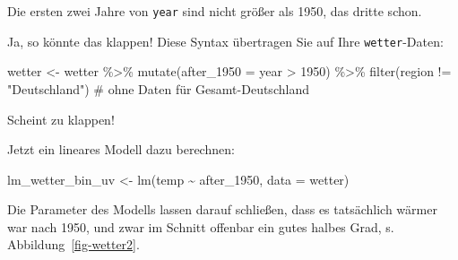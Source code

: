\documentclass[
  letterpaper,
]{scrbook}
\newenvironment{Shaded}{\begin{snugshade}}{\end{snugshade}}
\newcommand{\AttributeTok}[1]{\textcolor[rgb]{0.40,0.45,0.13}{#1}}
\newcommand{\CommentTok}[1]{\textcolor[rgb]{0.37,0.37,0.37}{#1}}
\newcommand{\DecValTok}[1]{\textcolor[rgb]{0.68,0.00,0.00}{#1}}
\newcommand{\FunctionTok}[1]{\textcolor[rgb]{0.28,0.35,0.67}{#1}}
\newcommand{\NormalTok}[1]{\textcolor[rgb]{0.00,0.23,0.31}{#1}}
\newcommand{\OtherTok}[1]{\textcolor[rgb]{0.00,0.23,0.31}{#1}}
\newcommand{\SpecialCharTok}[1]{\textcolor[rgb]{0.37,0.37,0.37}{#1}}
\newcommand{\StringTok}[1]{\textcolor[rgb]{0.13,0.47,0.30}{#1}}
\theoremstyle{definition}
\theoremstyle{definition}
\theoremstyle{definition}
\theoremstyle{remark}
\begin{document}
Die ersten zwei Jahre von \texttt{year} sind nicht größer als 1950, das
dritte schon.

Ja, so könnte das klappen! Diese Syntax übertragen Sie auf Ihre
\texttt{wetter}-Daten:

\begin{Shaded}
\begin{Highlighting}[]
\NormalTok{wetter }\OtherTok{\textless{}{-}}
\NormalTok{  wetter }\SpecialCharTok{\%\textgreater{}\%} 
  \FunctionTok{mutate}\NormalTok{(}\AttributeTok{after\_1950 =}\NormalTok{ year }\SpecialCharTok{\textgreater{}} \DecValTok{1950}\NormalTok{) }\SpecialCharTok{\%\textgreater{}\%} 
  \FunctionTok{filter}\NormalTok{(region }\SpecialCharTok{!=} \StringTok{"Deutschland"}\NormalTok{)  }\CommentTok{\# ohne Daten für Gesamt{-}Deutschland}
\end{Highlighting}
\end{Shaded}

Scheint zu klappen!

Jetzt ein lineares Modell dazu berechnen:

\begin{Shaded}
\begin{Highlighting}[]
\NormalTok{lm\_wetter\_bin\_uv }\OtherTok{\textless{}{-}} \FunctionTok{lm}\NormalTok{(temp }\SpecialCharTok{\textasciitilde{}}\NormalTok{ after\_1950, }\AttributeTok{data =}\NormalTok{ wetter)}
\end{Highlighting}
\end{Shaded}

Die Parameter des Modells lassen darauf schließen, dass es tatsächlich
wärmer war nach 1950, und zwar im Schnitt offenbar ein gutes halbes
Grad, s. Abbildung~\ref{fig-wetter2}.
\end{document}
